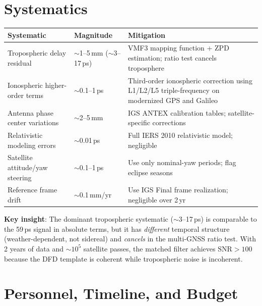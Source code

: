 \documentclass[11pt]{article}
\newcommand{\SNR}{\mathrm{SNR}}
\begin{document}
\section{Systematics}

\begin{center}
\renewcommand{\arraystretch}{1.25}
\begin{tabular}{@{}p{4cm}p{2.5cm}p{6.5cm}@{}}
\toprule
\textbf{Systematic} & \textbf{Magnitude} & \textbf{Mitigation} \\
\midrule
Tropospheric delay residual & $\sim$1--5\,mm ($\sim$3--17\,ps) &
  VMF3 mapping function + ZPD estimation; ratio test cancels
  troposphere \\
\midrule
Ionospheric higher-order terms & $\sim$0.1--1\,ps &
  Third-order ionospheric correction using L1/L2/L5 triple-frequency
  on modernized GPS and Galileo \\
\midrule
Antenna phase center variations & $\sim$2--5\,mm &
  IGS ANTEX calibration tables; satellite-specific corrections \\
\midrule
Relativistic modeling errors & $\sim$0.01\,ps &
  Full IERS 2010 relativistic model; negligible \\
\midrule
Satellite attitude/yaw steering & $\sim$0.1--1\,ps &
  Use only nominal-yaw periods; flag eclipse seasons \\
\midrule
Reference frame drift & $\sim$0.1\,mm/yr &
  Use IGS Final frame realization; negligible over 2\,yr \\
\bottomrule
\end{tabular}
\end{center}

\textbf{Key insight}: The dominant tropospheric systematic ($\sim$3--17\,ps)
is comparable to the 59\,ps signal in absolute terms, but it has
\emph{different} temporal structure (weather-dependent, not sidereal)
and \emph{cancels} in the multi-GNSS ratio test. With 2 years of data
and $\sim 10^5$ satellite passes, the matched filter achieves $\SNR > 100$
because the DFD template is coherent while tropospheric noise is
incoherent.

\section{Personnel, Timeline, and Budget}
\end{document}
